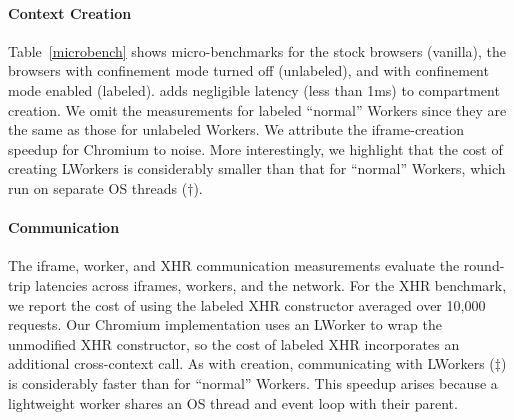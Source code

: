 \paragraph{Context Creation}
Table~\ref{microbench} shows micro-benchmarks for the stock
browsers (vanilla), the \sys{} browsers with confinement mode turned
off (unlabeled), and with confinement mode enabled (labeled).
%
\sys{} adds negligible latency (less than 1ms) to compartment
creation.
%
We omit the measurements for labeled ``normal'' Workers since they are
the same as those for unlabeled Workers.
%
We attribute the iframe-creation speedup for Chromium to noise.
%
More interestingly, we highlight that the cost of creating LWorkers is
considerably smaller than that for ``normal'' Workers, which run on
separate OS threads ($\dagger$).

\paragraph{Communication} The iframe, worker, and XHR communication measurements evaluate the
round-trip latencies across iframes, workers, and the network.
%
For the XHR benchmark, we report the cost of using the labeled XHR
constructor averaged over 10,000 requests.
%
Our Chromium implementation uses an  LWorker to wrap the unmodified
XHR constructor, so the cost of labeled XHR incorporates an additional
cross-context call.
%
As with creation, communicating with LWorkers ($\ddagger$)
is considerably faster than for ``normal'' Workers.
%
This speedup arises because a lightweight worker shares
 an OS thread and event loop with their parent.
%


